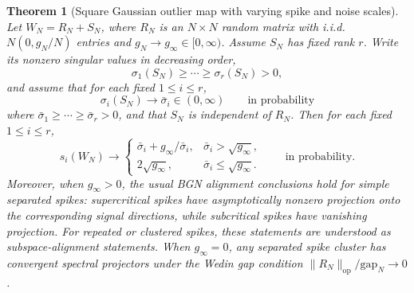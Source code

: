 \documentclass[11pt]{article}
\theoremstyle{plain}
\newtheorem{thm}{Theorem}[section]
\theoremstyle{definition}
\theoremstyle{remark}
\newcommand{\op}{\mathrm{op}}
\newcommand{\1}{\mathbf{1}}
\begin{document}
\begin{thm}[Square Gaussian outlier map with varying spike and noise scales]
\label{thm:BGN_square_variable}
Let \(W_N=R_N+S_N\), where \(R_N\) is an \(N\times N\) random matrix with i.i.d.\ \(N(0,g_N/N)\) entries and \(g_N\to g_\infty\in[0,\infty)\). Assume \(S_N\) has fixed rank \(r\). Write its nonzero singular values in decreasing order,
\[
\sigma_1(S_N)\ge\cdots\ge\sigma_r(S_N)>0,
\]
and assume that for each fixed \(1\le i\le r\),
\[
\sigma_i(S_N)\to \bar\sigma_i\in(0,\infty)
\qquad\text{in probability}
\]
where \(\bar\sigma_1\ge\cdots\ge\bar\sigma_r>0\), and that \(S_N\) is independent of \(R_N\).
Then for each fixed \(1\le i\le r\),
\[
s_i(W_N)\to
\begin{cases}
\bar\sigma_i+g_\infty/\bar\sigma_i, & \bar\sigma_i>\sqrt{g_\infty},\\[0.2em]
2\sqrt{g_\infty}, & \bar\sigma_i\le \sqrt{g_\infty}.
\end{cases}
\qquad\text{in probability.}
\]
Moreover, when \(g_\infty>0\), the usual BGN alignment conclusions hold for simple separated spikes: supercritical spikes have asymptotically nonzero projection onto the corresponding signal directions, while subcritical spikes have vanishing projection. For repeated or clustered spikes, these statements are understood as subspace-alignment statements. When \(g_\infty=0\), any separated spike cluster has convergent spectral projectors under the Wedin gap condition \(\|R_N\|_{\op}/\mathrm{gap}_N\to0\).
\end{thm}
\end{document}
